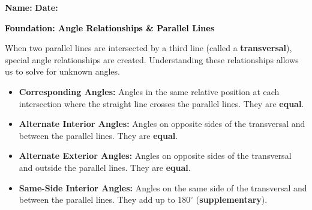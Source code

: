\documentclass[12pt, letterpaper, fleqn]{article}
\begin{document}
\textbf{Name:} \underline{\hspace{5cm}}
\hfill
\textbf{Date:} \underline{\hspace{3cm}}\\

\begin{tcolorbox}[colback=customteal!20]
    \large\textcolor{black}{\textbf{Foundation: Angle Relationships \& Parallel Lines}}
\end{tcolorbox}

\vspace{3mm}

\noindent
When two parallel lines are intersected by a third line (called a \textbf{transversal}), special angle relationships are created. Understanding these relationships allows us to solve for unknown angles.

\begin{itemize}
    \item \textbf{Corresponding Angles:} Angles in the same relative position at each intersection where the straight line crosses the parallel lines. They are \textbf{equal}.
    \item \textbf{Alternate Interior Angles:} Angles on opposite sides of the transversal and between the parallel lines. They are \textbf{equal}.
    \item \textbf{Alternate Exterior Angles:} Angles on opposite sides of the transversal and outside the parallel lines. They are \textbf{equal}.
    \item \textbf{Same-Side Interior Angles:} Angles on the same side of the transversal and between the parallel lines. They add up to $180^\circ$ (\textbf{supplementary}).
\end{itemize}

\vspace{4mm}
\end{document}
